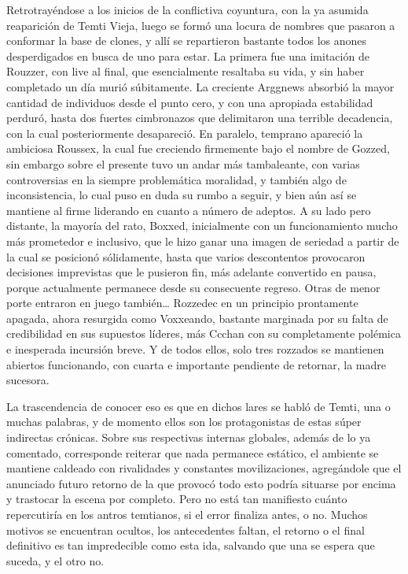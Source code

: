 \documentclass[
]{book}
\begin{document}
Retrotrayéndose a los inicios de la conflictiva coyuntura, con la ya asumida reaparición de Temti Vieja, luego se formó una locura de nombres que pasaron a conformar la base de clones, y allí se repartieron bastante todos los anones desperdigados en busca de uno para estar. La primera fue una imitación de Rouzzer, con live al final, que esencialmente resaltaba su vida, y sin haber completado un día murió súbitamente. La creciente Arggnews absorbió la mayor cantidad de individuos desde el punto cero, y con una apropiada estabilidad perduró, hasta dos fuertes cimbronazos que delimitaron una terrible decadencia, con la cual posteriormente desapareció. En paralelo, temprano apareció la ambiciosa Roussex, la cual fue creciendo firmemente bajo el nombre de Gozzed, sin embargo sobre el presente tuvo un andar más tambaleante, con varias controversias en la siempre problemática moralidad, y también algo de inconsistencia, lo cual puso en duda su rumbo a seguir, y bien aún así se mantiene al firme liderando en cuanto a número de adeptos. A su lado pero distante, la mayoría del rato, Boxxed, inicialmente con un funcionamiento mucho más prometedor e inclusivo, que le hizo ganar una imagen de seriedad a partir de la cual se posicionó sólidamente, hasta que varios descontentos provocaron decisiones imprevistas que le pusieron fin, más adelante convertido en pausa, porque actualmente permanece desde su consecuente regreso. Otras de menor porte entraron en juego también\ldots{} Rozzedec en un principio prontamente apagada, ahora resurgida como Voxxeando, bastante marginada por su falta de credibilidad en sus supuestos líderes, más Ccchan con su completamente polémica e inesperada incursión breve. Y de todos ellos, solo tres rozzados se mantienen abiertos funcionando, con cuarta e importante pendiente de retornar, la madre sucesora.

La trascendencia de conocer eso es que en dichos lares se habló de Temti, una o muchas palabras, y de momento ellos son los protagonistas de estas súper indirectas crónicas. Sobre sus respectivas internas globales, además de lo ya comentado, corresponde reiterar que nada permanece estático, el ambiente se mantiene caldeado con rivalidades y constantes movilizaciones, agregándole que el anunciado futuro retorno de la que provocó todo esto podría situarse por encima y trastocar la escena por completo. Pero no está tan manifiesto cuánto repercutiría en los antros temtianos, si el error finaliza antes, o no. Muchos motivos se encuentran ocultos, los antecedentes faltan, el retorno o el final definitivo es tan impredecible como esta ida, salvando que una se espera que suceda, y el otro no.
\end{document}
